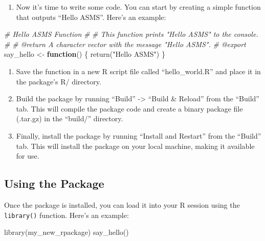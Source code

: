 \documentclass[
]{book}
\newenvironment{Shaded}{\begin{snugshade}}{\end{snugshade}}
\newcommand{\CommentTok}[1]{\textcolor[rgb]{0.56,0.35,0.01}{\textit{#1}}}
\newcommand{\ControlFlowTok}[1]{\textcolor[rgb]{0.13,0.29,0.53}{\textbf{#1}}}
\newcommand{\FunctionTok}[1]{\textcolor[rgb]{0.00,0.00,0.00}{#1}}
\newcommand{\NormalTok}[1]{#1}
\newcommand{\OtherTok}[1]{\textcolor[rgb]{0.56,0.35,0.01}{#1}}
\newcommand{\StringTok}[1]{\textcolor[rgb]{0.31,0.60,0.02}{#1}}
\providecommand{\tightlist}{%
  \setlength{\itemsep}{0pt}\setlength{\parskip}{0pt}}
\begin{document}
\begin{enumerate}
\def\labelenumi{\arabic{enumi}.}
\tightlist
\item
  Now it's time to write some code. You can start by creating a simple function that outputs ``Hello ASMS''. Here's an example:
\end{enumerate}

\begin{Shaded}
\begin{Highlighting}[]
\CommentTok{\#\textquotesingle{} Hello ASMS Function}
\CommentTok{\#\textquotesingle{}}
\CommentTok{\#\textquotesingle{} This function prints "Hello ASMS" to the console.}
\CommentTok{\#\textquotesingle{}}
\CommentTok{\#\textquotesingle{} @return A character vector with the message "Hello ASMS".}
\CommentTok{\#\textquotesingle{} @export}
\NormalTok{say\_hello }\OtherTok{\textless{}{-}} \ControlFlowTok{function}\NormalTok{() \{}
  \FunctionTok{return}\NormalTok{(}\StringTok{"Hello ASMS"}\NormalTok{)}
\NormalTok{\}}
\end{Highlighting}
\end{Shaded}

\begin{enumerate}
\def\labelenumi{\arabic{enumi}.}
\tightlist
\item
  Save the function in a new R script file called ``hello\_world.R'' and place it in the package's R/ directory.
\item
  Build the package by running ``Build'' -\textgreater{} ``Build \& Reload'' from the ``Build'' tab. This will compile the package code and create a binary package file (.tar.gz) in the ``build/'' directory.
\item
  Finally, install the package by running ``Install and Restart'' from the ``Build'' tab. This will install the package on your local machine, making it available for use.
\end{enumerate}

\hypertarget{using-the-package}{%
\subsection*{Using the Package}\label{using-the-package}}

Once the package is installed, you can load it into your R session using the \texttt{library()} function. Here's an example:

\begin{Shaded}
\begin{Highlighting}[]
\FunctionTok{library}\NormalTok{(my\_new\_rpackage)}
\FunctionTok{say\_hello}\NormalTok{()}
\end{Highlighting}
\end{Shaded}
\end{document}

